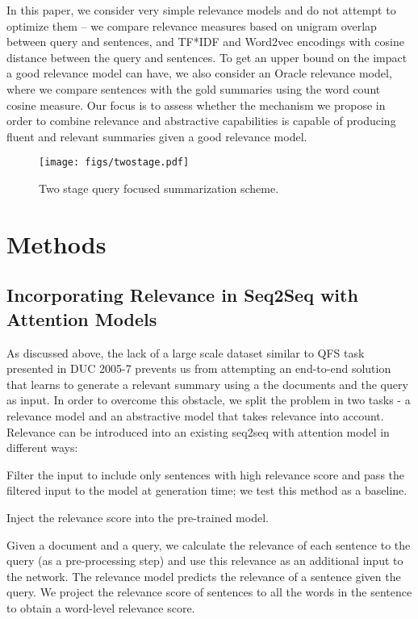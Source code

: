 \documentclass[11pt,a4paper]{article}
\begin{document}
In this paper, we consider very simple relevance models and do not attempt to optimize them -- we compare relevance measures based on unigram overlap between query and sentences, and TF*IDF and Word2vec encodings with cosine distance between the query and sentences.  To get an upper bound on the impact a good relevance model can have, we also consider an Oracle relevance model, where we compare sentences with the gold summaries using the word count cosine measure.  Our focus is to assess whether the mechanism we propose in order to combine relevance and abstractive capabilities is capable of producing fluent and relevant summaries given a good relevance model.

\begin{figure}
  \centering 
  \texttt{[image: figs/twostage.pdf]} 
  \caption{Two stage query focused summarization scheme.}\label{fig:RSAtwostage} 
\end{figure} 


\section{Methods}

\subsection{Incorporating Relevance in Seq2Seq with Attention Models}

As discussed above, the lack of a large scale dataset similar to QFS task presented in DUC 2005-7 prevents us from attempting an end-to-end solution that learns to generate a relevant summary using a the documents and the query as input. In order to overcome this obstacle, we split the problem in two tasks - a relevance model and an abstractive model that takes relevance into account.  Relevance can be introduced into an existing seq2seq with attention model in different ways: 

\begin{enumerate*}[label=(\itshape\alph*\upshape)]
\item Filter the input to include only sentences with high relevance score and pass the filtered input to the model at generation time; we test this method as a baseline. 
\item Inject the relevance score into the pre-trained model.
\end{enumerate*}

Given a document and a query, we calculate the relevance of each sentence to the query (as a pre-processing step) and use this relevance as an additional input to the network.  The relevance model predicts the relevance of a sentence given the query.  We project the relevance score of sentences to all the words in the sentence to obtain a word-level relevance score.  
\end{document}
